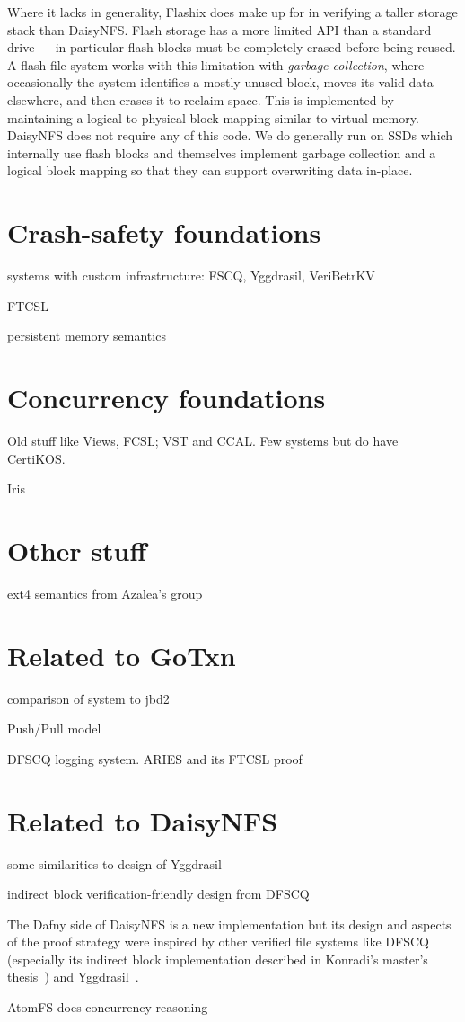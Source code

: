 Where it lacks in generality, Flashix does make up for in verifying a taller
storage stack than DaisyNFS. Flash storage has a more limited API than a
standard drive --- in particular flash blocks must be completely erased before
being reused. A flash file system works with this limitation with \emph{garbage
collection}, where occasionally the system identifies a mostly-unused block,
moves its valid data elsewhere, and then erases it to reclaim space. This is
implemented by maintaining a logical-to-physical block mapping similar to
virtual memory. DaisyNFS does not require any of this code. We do generally run
on SSDs which internally use flash blocks and themselves implement garbage
collection and a logical block mapping so that they can support overwriting data
in-place.

\section{Crash-safety foundations}

systems with custom infrastructure: FSCQ, Yggdrasil, VeriBetrKV

FTCSL

persistent memory semantics

\section{Concurrency foundations}

Old stuff like Views, FCSL; VST and CCAL. Few systems but do have CertiKOS.

Iris

\section{Other stuff}

ext4 semantics from Azalea's group

\section{Related to GoTxn}

comparison of system to jbd2

Push/Pull model

DFSCQ logging system. ARIES and its FTCSL proof



\section{Related to DaisyNFS}

some similarities to design of Yggdrasil

indirect block verification-friendly design from DFSCQ

The Dafny side of DaisyNFS is a new implementation but its design and aspects of
the proof strategy were inspired by other verified file systems like
DFSCQ~\cite{chen:dfscq} (especially its indirect block implementation described
in Konradi's master's thesis~\cite{akonradi-meng}) and
Yggdrasil~\cite{sigurbjarnarson:yggdrasil}.

AtomFS does concurrency reasoning


